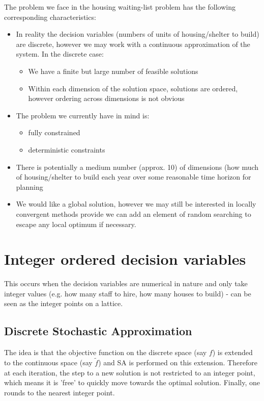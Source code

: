 \message{ !name(SO-Methods.tex)}\documentclass{article}
\begin{document}
The problem we face in the housing waiting-list problem has the following corresponding characteristics:
\begin{itemize}
  \item In reality the decision variables (numbers of units of housing/shelter to build) are discrete, however we may work with a continuous approximation of the system. In the discrete case:
  \begin{itemize}
    \item We have a finite but large number of feasible solutions
    \item Within each dimension of the solution space, solutions are ordered, however ordering across dimensions is not obvious
  \end{itemize}
  \item The problem we currently have in mind is:
  \begin{itemize}
    \item fully constrained
    \item deterministic constraints  
  \end{itemize}
  \item There is potentially a medium number (approx. 10) of dimensions (how much of housing/shelter to build each year over some reasonable time horizon for planning
  \item We would like a global solution, however we may still be interested in locally convergent methods provide we can add an element of random searching to escape any local optimum if necessary. 
\end{itemize}

\newpage

\section{Integer ordered decision variables}

This occurs when the decision variables are numerical in nature and only take integer values (e.g. how many staff to hire, how many houses to build) - can be seen as the integer points on a lattice.

\subsection{Discrete Stochastic Approximation}

The idea is that the objective function on the discrete space (say $f$) is extended to the continuous space (say $\tilde{f}$) and SA is performed on this extension. Therefore at each iteration, the step to a new solution is not restricted to an integer point, which means it is 'free' to quickly move towards the optimal solution. Finally, one rounds to the nearest integer point. \newline
\end{document}
